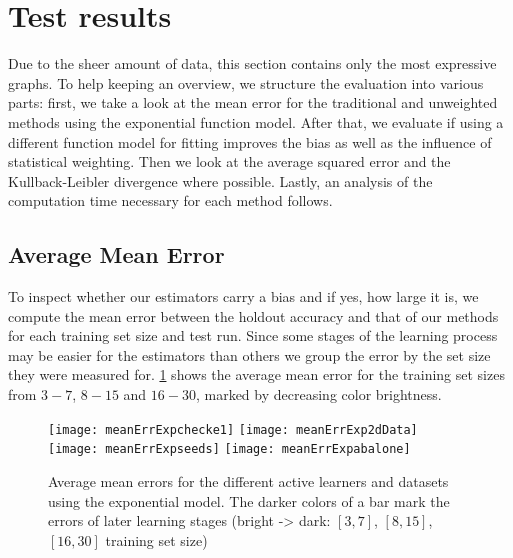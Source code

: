 \section{Test results}
\label{evaluation:results}
Due to the sheer amount of data, this section contains only the most expressive graphs. To help keeping an overview, we structure the evaluation into various parts: first, we take a look at the mean error for the traditional and unweighted methods using the exponential function model. After that, we evaluate if using a different function model for fitting improves the bias as well as the influence of statistical weighting. Then we look at the average squared error and the Kullback-Leibler divergence where possible. Lastly, an analysis of the computation time necessary for each method follows.

\subsection{Average Mean Error}

To inspect whether our estimators carry a bias and if yes, how large it is, we compute the mean error between the holdout accuracy and that of our methods for each training set size and test run. Since some stages of the learning process may be easier for the estimators than others we group the error by the set size they were measured for. \ref{fig:meanErrorsExp} shows the average mean error for the training set sizes from $3-7$, $8-15$ and $16-30$, marked by decreasing color brightness.

\begin{figure}[h]
	\centering
	\texttt{[image: meanErrExpchecke1]}
	\texttt{[image: meanErrExp2dData]}
	\texttt{[image: meanErrExpseeds]}
	\texttt{[image: meanErrExpabalone]}
	\caption{Average mean errors for the different active learners and datasets using the exponential model. The darker colors of a bar mark the errors of later learning stages (bright -> dark: $[3,7]$, $[8,15]$, $[16,30]$ training set size)}
	\label{fig:meanErrorsExp}
\end{figure}

